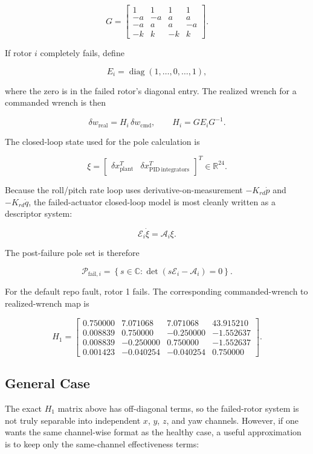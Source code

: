\documentclass[11pt]{article}
\begin{document}
\[
G =
\begin{bmatrix}
1&1&1&1\\
-a&-a&a&a\\
-a&a&a&-a\\
-k&k&-k&k
\end{bmatrix}.
\]

If rotor \(i\) completely fails, define

\[
E_i=\operatorname{diag}(1,\ldots,0,\ldots,1),
\]

where the zero is in the failed rotor's diagonal entry. The realized wrench for
a commanded wrench is then

\[
\boxed{
\delta w_{\mathrm{real}}
=
H_i\,\delta w_{\mathrm{cmd}},
\qquad
H_i=G E_i G^{-1}.
}
\]

The closed-loop state used for the pole calculation is

\[
\xi =
\begin{bmatrix}
\delta x_{\mathrm{plant}}^{T} &
\delta x_{\mathrm{PID\ integrators}}^{T}
\end{bmatrix}^{T}
\in \mathbb{R}^{24}.
\]

Because the roll/pitch rate loop uses derivative-on-measurement
\(-K_{rd}\dot{p}\) and \(-K_{rd}\dot{q}\), the failed-actuator closed-loop model
is most cleanly written as a descriptor system:

\[
\boxed{
\mathcal{E}_i\dot{\xi}=\mathcal{A}_i\xi.
}
\]

The post-failure pole set is therefore

\[
\boxed{
\mathcal{P}_{\mathrm{fail},i}
=
\left\{s\in\mathbb{C}:
\det(s\mathcal{E}_i-\mathcal{A}_i)=0
\right\}.
}
\]

For the default repo fault, rotor 1 fails. The corresponding commanded-wrench
to realized-wrench map is

\[
H_1 =
\begin{bmatrix}
0.750000 & 7.071068 & 7.071068 & 43.915210\\
0.008839 & 0.750000 & -0.250000 & -1.552637\\
0.008839 & -0.250000 & 0.750000 & -1.552637\\
0.001423 & -0.040254 & -0.040254 & 0.750000
\end{bmatrix}.
\]

\subsection{General Case}

The exact \(H_1\) matrix above has off-diagonal terms, so the failed-rotor
system is not truly separable into independent \(x\), \(y\), \(z\), and yaw
channels. However, if one wants the same channel-wise format as the healthy
case, a useful approximation is to keep only the same-channel effectiveness
terms:
\end{document}
